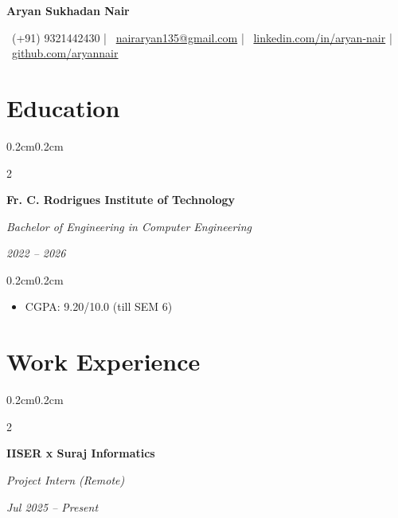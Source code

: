 \documentclass[10pt, letterpaper]{article}
\newenvironment{highlights}{
    \begin{itemize}[
        topsep=0.10cm,
        parsep=0.10cm,
        partopsep=0pt,
        itemsep=0pt,
        leftmargin=0.4cm + 10pt
    ]
}{\end{itemize}}
\newenvironment{onecolentry}{
    \begin{adjustwidth}{0.2cm}{0.2cm}
}{\end{adjustwidth}}
\newenvironment{twocolentry}[2][]{
    \onecolentry
    \def\secondColumn{#2}
    \setcolumnwidth{\fill, 4.5cm}
    \begin{paracol}{2}
}{
    \switchcolumn \raggedleft \secondColumn
    \end{paracol}
    \endonecolentry
}
\newenvironment{header}{
    \centering\linespread{1.5}
}{\par}
\begin{document}
\begin{header}
    \textbf{\fontsize{24pt}{24pt}\selectfont Aryan Sukhadan Nair}
    
    \vspace{0.3cm}
    
    \normalsize
    \faPhone\ (+91) 9321442430 \hspace{0.25cm} | \hspace{0.25cm}
    \faEnvelope\ \href{mailto:nairaryan135@gmail.com}{nairaryan135@gmail.com} \hspace{0.25cm} | \hspace{0.25cm}
    \faLinkedin\ \href{https://www.linkedin.com/in/aryan-nair-244181308/}{linkedin.com/in/aryan-nair} \hspace{0.25cm} | \hspace{0.25cm}
    \faGithub\ \href{https://github.com/ASN-cmd}{github.com/aryannair}
\end{header}

\vspace{0.3cm}

\section{Education}
    
\begin{twocolentry}{
    \textit{2022 -- 2026}
}
    \textbf{Fr. C. Rodrigues Institute of Technology}
    
    \textit{Bachelor of Engineering in Computer Engineering}
\end{twocolentry}

\vspace{0.1cm}
\begin{onecolentry}
    \begin{highlights}
        \item CGPA: 9.20/10.0 (till SEM 6)
    \end{highlights}
\end{onecolentry}

\section{Work Experience}
    
    \begin{twocolentry}{
        \textit{Jul 2025 -- Present}
    }
        \textbf{IISER x Suraj Informatics}
        
        \textit{Project Intern (Remote)}
    \end{twocolentry}
    
\end{document}
